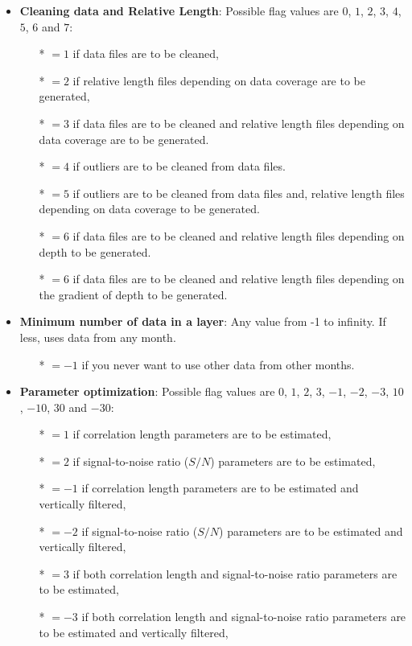\begin{itemize}
\item {\bf Cleaning data and Relative Length}: Possible flag values are $0$, $1$, $2$, $3$, $4$, $5$, $6$ and $7$:
              \begin{itemize}
                \item[*] $=1$ if data files are to be cleaned,
                \item[*] $=2$ if relative length files depending on data coverage are to be generated,
                \item[*] $=3$ if data files are to be cleaned and relative length files depending on data coverage are to be generated.
                \item[*] $=4$ if outliers are to be cleaned from data files.
                \item[*] $=5$ if outliers are to be cleaned from data files and, relative length files depending on data coverage to be generated.
                \item[*] $=6$ if data files are to be cleaned and relative length files depending on depth to be generated.
		\item[*] $=6$ if data files are to be cleaned and relative length files depending on the gradient of depth to be generated.
              \end{itemize}

\item {\bf Minimum number of data in a layer}: Any value from -1 to infinity. If less, uses data from any month.
                \begin{itemize}
                \item[*] $=-1$ if you never want to use other data from other months.
                \end{itemize}
\item {\bf Parameter optimization}: Possible flag values are $0$, $1$, $2$, $3$, $-1$, $-2$, $-3$, $10$, $-10$, $30$ and $-30$:
              \begin{itemize}
                \item[*] $=1$ if correlation length parameters are to be estimated,
                \item[*] $=2$ if signal-to-noise ratio ($S/N$) parameters are to be estimated,
                \item[*] $=-1$ if correlation length parameters are to be estimated and vertically filtered,
                \item[*] $=-2$ if signal-to-noise ratio ($S/N$) parameters are to be estimated and vertically filtered,
                \item[*] $=3$ if both  correlation length and  signal-to-noise ratio parameters are to be estimated,
                \item[*] $=-3$ if both  correlation length and  signal-to-noise ratio parameters are to be estimated and vertically filtered,


\end{itemize}
\end{itemize}
